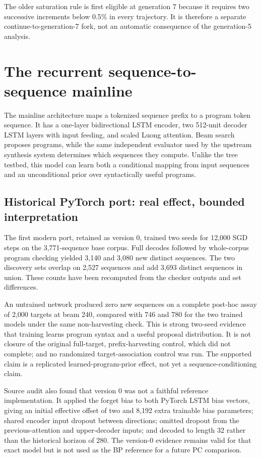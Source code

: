 \documentclass[11pt]{article}
\begin{document}
The older saturation rule is first eligible at generation 7 because it requires two
successive increments below 0.5\% in every trajectory.  It is therefore a separate
continue-to-generation-7 fork, not an automatic consequence of the generation-5 analysis.

\section{The recurrent sequence-to-sequence mainline}
\label{sec:nmt}

The mainline architecture maps a tokenized sequence prefix to a program token sequence.
It has a one-layer bidirectional LSTM encoder, two 512-unit decoder LSTM layers with input
feeding, and scaled Luong attention.  Beam search proposes programs, while the same
independent evaluator used by the upstream synthesis system determines which sequences
they compute.  Unlike the tree testbed, this model can learn both a conditional mapping
from input sequences and an unconditional prior over syntactically useful programs.

\subsection{Historical PyTorch port: real effect, bounded interpretation}

The first modern port, retained as version 0, trained two seeds for 12,000 SGD steps on the
3,771-sequence base corpus.  Full decodes followed by whole-corpus program checking yielded
3,140 and 3,080 new distinct sequences.  The two discovery sets overlap on 2,527 sequences
and add 3,693 distinct sequences in union.  These counts have been recomputed from the
checker outputs and set differences.

An untrained network produced zero new sequences on a complete post-hoc assay of 2,000
targets at beam 240, compared with 746 and 780 for the two trained models under the same
non-harvesting check.  This is strong two-seed evidence that training learns program syntax
and a useful proposal distribution.  It is not closure of the original full-target,
prefix-harvesting control, which did not complete; and no randomized target-association
control was run.  The supported claim is a replicated learned-program-prior effect, not yet
a sequence-conditioning claim.

Source audit also found that version 0 was not a faithful reference implementation.  It
applied the forget bias to both PyTorch LSTM bias vectors, giving an initial effective
offset of two and 8,192 extra trainable bias parameters; shared encoder input dropout
between directions; omitted dropout from the previous-attention and upper-decoder inputs;
and decoded to length 32 rather than the historical horizon of 280.  The version-0
evidence remains valid for that exact model but is not used as the BP reference for a
future PC comparison.
\end{document}
